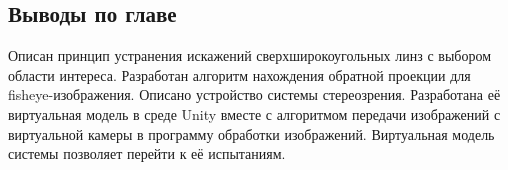 \subsection{Выводы по главе}

Описан принцип устранения искажений сверхширокоугольных линз с выбором области интереса. Разработан алгоритм нахождения обратной 
проекции для fisheye-изображения. Описано устройство системы стереозрения. Разработана её виртуальная модель в среде Unity вместе с 
алгоритмом передачи изображений с виртуальной камеры в программу обработки изображений.  
Виртуальная модель системы позволяет перейти к её испытаниям.